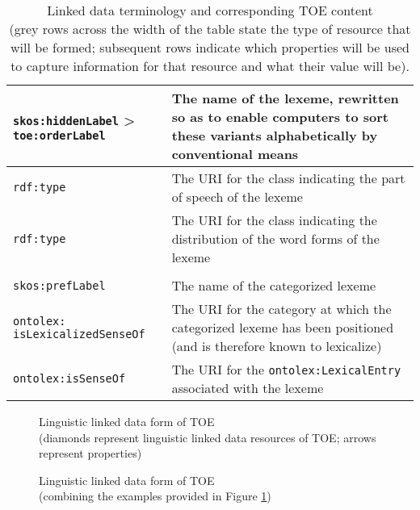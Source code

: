\begin{table}[ht]
\begin{tabular}{|p{}|p{}|}
		\texttt{skos:hiddenLabel} \newline > \texttt{toe:orderLabel} & The name of the lexeme, rewritten so as to enable computers to sort these variants alphabetically by conventional means \\ \hline
		\texttt{rdf:type} & The URI for the class indicating the part of speech of the lexeme \\ \hline
		\texttt{rdf:type} & The URI for the class indicating the distribution of the word forms of the lexeme \\ \hline
		\rowcolor{lightgray}
        \multicolumn{2}{l}{
        \textcolor{white}{\texttt{ontolex:LexicalSense}}} \\ \hline
		\texttt{skos:prefLabel} & The name of the categorized lexeme \\ \hline
		\texttt{ontolex: \newline isLexicalizedSenseOf} & The URI for the category at which the categorized lexeme has been positioned (and is therefore known to lexicalize) \\ \hline
		\texttt{ontolex:isSenseOf} & The URI for the \texttt{ontolex:LexicalEntry} associated with the lexeme \\ \hline
	\end{tabular}
	\caption{Linked data terminology and corresponding TOE content\\
    (grey rows across the width of the table state the type of resource that will be formed; subsequent rows indicate which properties will be used to capture information for that resource and what their value will be).\label{table:Stolk2019b:mappingToLLD}}
\end{table}

\begin{figure}[htbp]
	\framebox[\textwidth]{
		\scalebox{0.65}[0.65]{
%			
		}
	}
	\caption[]{\label{fig:Stolk2019b:TOE-LLD-elements} Linguistic linked data form of TOE\\
(diamonds represent linguistic linked data resources of TOE; arrows represent properties)}
\end{figure}
 
 
\begin{figure}[htbp]
	\framebox[\textwidth]{
		\scalebox{0.65}[0.65]{
%			
		}
	}
	\caption[]{\label{fig:Stolk2019b:TOE-LLD-overview} Linguistic linked data form of TOE \\
(combining the examples provided in Figure \ref{fig:Stolk2019b:TOE-LLD-elements})}
\end{figure}

